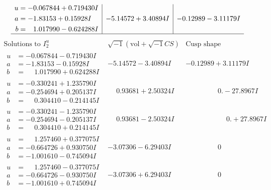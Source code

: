 \documentclass[1p]{elsarticle_modified}
\theoremstyle{definition}
\newcommand{\I}{\sqrt{-1}}
\begin{document}
$$\begin{array}{c|c|c}
\begin{aligned}
u &= -0.067844 + 0.719430 I \\
a &= -1.83153 + 0.15928 I \\
b &= \phantom{-}1.017990 - 0.624288 I\end{aligned}
 & -5.14572 + 3.40894 I & -0.12989 - 3.11179 I\\
 \hline 
 \end{array}$$\newpage$$\begin{array}{c|c|c}  
\text{Solutions to }I^u_{2}& \I (\text{vol} + \sqrt{-1}CS) & \text{Cusp shape}\\
 \hline 
\begin{aligned}
u &= -0.067844 - 0.719430 I \\
a &= -1.83153 - 0.15928 I \\
b &= \phantom{-}1.017990 + 0.624288 I\end{aligned}
 & -5.14572 - 3.40894 I & -0.12989 + 3.11179 I \\ \hline\begin{aligned}
u &= -0.330241 + 1.235790 I \\
a &= -0.254694 + 0.205137 I \\
b &= \phantom{-}0.304410 - 0.214145 I\end{aligned}
 & \phantom{-}0.93681 + 2.50324 I & \phantom{-0.000000 } 0. - 27.8967 I \\ \hline\begin{aligned}
u &= -0.330241 - 1.235790 I \\
a &= -0.254694 - 0.205137 I \\
b &= \phantom{-}0.304410 + 0.214145 I\end{aligned}
 & \phantom{-}0.93681 - 2.50324 I & \phantom{-0.000000 -}0. + 27.8967 I \\ \hline\begin{aligned}
u &= \phantom{-}1.257460 + 0.377075 I \\
a &= -0.664726 + 0.930750 I \\
b &= -1.001610 - 0.745094 I\end{aligned}
 & -3.07306 - 6.29403 I & \phantom{-0.000000 } 0 \\ \hline\begin{aligned}
u &= \phantom{-}1.257460 - 0.377075 I \\
a &= -0.664726 - 0.930750 I \\
b &= -1.001610 + 0.745094 I\end{aligned}
 & -3.07306 + 6.29403 I & \phantom{-0.000000 } 0 \\ \hline\begin{aligned}

\end{aligned}
\end{array}$$
\end{document}
